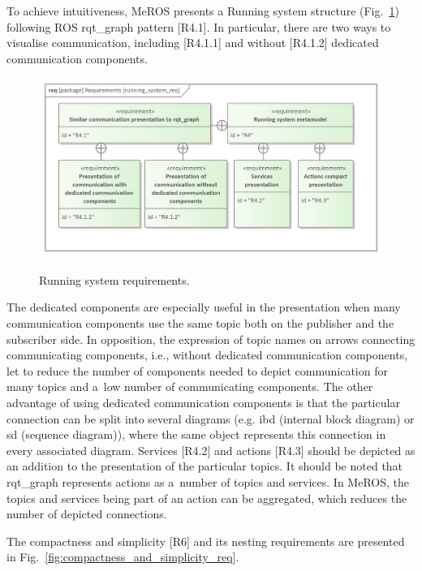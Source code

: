 \documentclass[11pt,oneside,a4paper]{article}
\begin{document}
	To achieve intuitiveness, MeROS presents a Running system structure (Fig.~\ref{fig:running_system_req}) following ROS rqt\_graph pattern [R4.1]. In particular, there are two ways to visualise communication, including [R4.1.1] and without [R4.1.2]
	dedicated communication components.
	\begin{figure}[H]
		\centering
		\begin{center}
			{\includegraphics[scale=0.9]{img/requirement_pkg/running_system_req.png}}
		\end{center}
		\caption{Running system requirements.} 
		\label{fig:running_system_req}
	\end{figure}
	 The dedicated components are especially useful in the presentation when many communication components use the same topic both on the publisher and the subscriber side. In opposition, the expression of topic names on arrows connecting communicating components, i.e., without dedicated communication components, let to reduce the number of components needed to depict communication for many topics and a~low number of communicating components. The other advantage of using dedicated communication components is that the particular connection can be split into several diagrams (e.g. ibd (internal block diagram) or sd (sequence diagram)), where the same object represents this connection in every associated diagram. Services [R4.2] and actions [R4.3] should be depicted as an addition to the presentation of the particular topics. It should be noted that rqt\_graph represents actions as a~number of topics and services. In MeROS, the topics and services being part of an action can be aggregated, which reduces the number of depicted connections.
		
			
	The compactness and simplicity [R6] and its nesting requirements are presented in Fig.~\ref{fig:compactness_and_simplicity_req}. 
	
\end{document}
